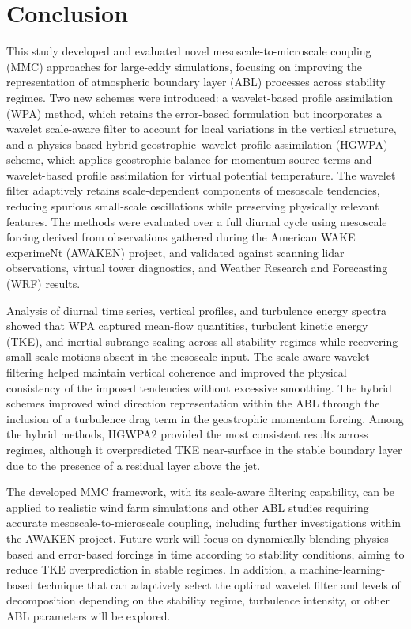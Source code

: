 \section{Conclusion}
\label{sec:conclusions}

This study developed and evaluated novel mesoscale-to-microscale coupling (MMC) approaches for large-eddy simulations, focusing on improving the representation of atmospheric boundary layer (ABL) processes across stability regimes. Two new schemes were introduced: a wavelet-based profile assimilation (WPA) method, which retains the error-based formulation but incorporates a wavelet scale-aware filter to account for local variations in the vertical structure, and a physics-based hybrid geostrophic–wavelet profile assimilation (HGWPA) scheme, which applies geostrophic balance for momentum source terms and wavelet-based profile assimilation for virtual potential temperature. The wavelet filter adaptively retains scale-dependent components of mesoscale tendencies, reducing spurious small-scale oscillations while preserving physically relevant features. The methods were evaluated over a full diurnal cycle using mesoscale forcing derived from observations gathered during the American WAKE experimeNt (AWAKEN) project, and validated against scanning lidar observations, virtual tower diagnostics, and Weather Research and Forecasting (WRF) results.  

Analysis of diurnal time series, vertical profiles, and turbulence energy spectra showed that WPA captured mean-flow quantities, turbulent kinetic energy (TKE), and inertial subrange scaling across all stability regimes while recovering small-scale motions absent in the mesoscale input. The scale-aware wavelet filtering helped maintain vertical coherence and improved the physical consistency of the imposed tendencies without excessive smoothing. The hybrid schemes improved wind direction representation within the ABL through the inclusion of a turbulence drag term in the geostrophic momentum forcing. Among the hybrid methods, HGWPA2 provided the most consistent results across regimes, although it overpredicted TKE near-surface in the stable boundary layer due to the presence of a residual layer above the jet.  

The developed MMC framework, with its scale-aware filtering capability, can be applied to realistic wind farm simulations and other ABL studies requiring accurate mesoscale-to-microscale coupling, including further investigations within the AWAKEN project. Future work will focus on dynamically blending physics-based and error-based forcings in time according to stability conditions, aiming to reduce TKE overprediction in stable regimes. In addition, a machine-learning-based technique that can adaptively select the optimal wavelet filter and levels of decomposition depending on the stability regime, turbulence intensity, or other ABL parameters will be explored.

